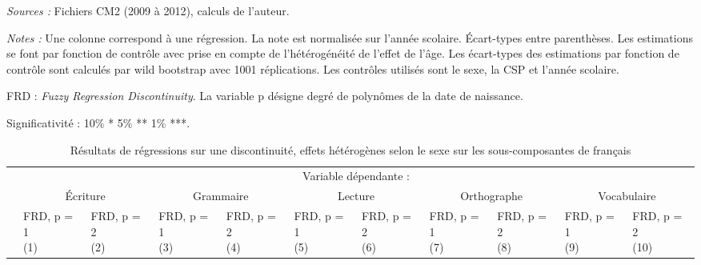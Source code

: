 \documentclass[
]{book}
\begin{document}
\begin{ThreePartTable}
\begin{TableNotes}
\item \textit{Sources :} Fichiers CM2 (2009 à 2012), calculs de l'auteur.
\item \textit{Notes :} Une colonne correspond à une régression. La note est normalisée sur l'année scolaire. Écart-types entre parenthèses. Les estimations se font par fonction de contrôle avec prise en compte de l'hétérogénéité de l'effet de l'âge. Les écart-types des estimations par fonction de contrôle sont calculés par wild bootstrap avec 1001 réplications. Les contrôles utilisés sont le sexe, la CSP et l'année scolaire.
\item FRD : \textit{Fuzzy Regression Discontinuity}. La variable p désigne degré de polynômes de la date de naissance.
\item Significativité : 10\% * 5\% ** 1\% ***.
\end{TableNotes}
\begin{longtable}[t]{lllllllllll}
\caption{\label{tab:agefrdcfhmodelssexessitemsfrench}Résultats de régressions sur une discontinuité, effets hétérogènes selon le sexe sur les sous-composantes de français}\\
\toprule
\multicolumn{1}{c}{} & \multicolumn{10}{c}{Variable dépendante : } \\
\cmidrule(l{3pt}r{3pt}){2-11}
\multicolumn{1}{c}{} & \multicolumn{2}{c}{Écriture} & \multicolumn{2}{c}{Grammaire} & \multicolumn{2}{c}{Lecture} & \multicolumn{2}{c}{Orthographe} & \multicolumn{2}{c}{Vocabulaire} \\
\cmidrule(l{3pt}r{3pt}){2-3} \cmidrule(l{3pt}r{3pt}){4-5} \cmidrule(l{3pt}r{3pt}){6-7} \cmidrule(l{3pt}r{3pt}){8-9} \cmidrule(l{3pt}r{3pt}){10-11}
 & \makecell{FRD, p = 1 \\ (1) } & \makecell{FRD, p = 2 \\ (2) } & \makecell{FRD, p = 1 \\ (3) } & \makecell{FRD, p = 2 \\ (4) } & \makecell{FRD, p = 1 \\ (5) } & \makecell{FRD, p = 2 \\ (6) } & \makecell{FRD, p = 1 \\ (7) } & \makecell{FRD, p = 2 \\ (8) } & \makecell{FRD, p = 1 \\ (9) } & \makecell{FRD, p = 2 \\ (10) }\\
\midrule
\endfirsthead

\end{longtable}
\end{ThreePartTable}
\end{document}
